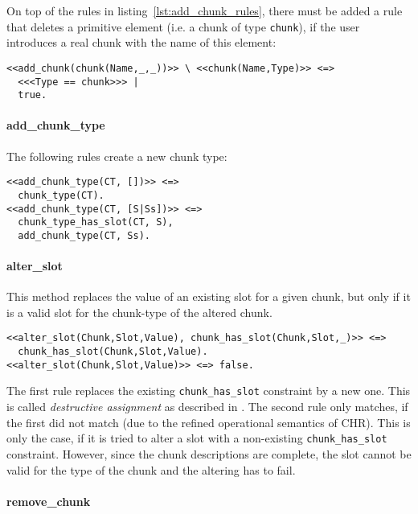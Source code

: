 On top of the rules in listing~\ref{lst:add_chunk_rules}, there must be added a rule that deletes a primitive element (i.e. a chunk of type \lstinline|chunk|), if the user introduces a real chunk with the name of this element:

\begin{lstlisting}[caption={Clean up primitive elements}]  
% delete chunk of Type chunk, if real chunk is added
<<add_chunk(chunk(Name,_,_))>> \ <<chunk(Name,Type)>> <=> 
  <<<Type == chunk>>> |
  true.
\end{lstlisting}


\paragraph{add\_chunk\_type}

The following rules create a new chunk type:

\begin{lstlisting}[caption={rules for \texttt{add\_chunk\_type}}]
<<add_chunk_type(CT, [])>> <=> 
  chunk_type(CT).
<<add_chunk_type(CT, [S|Ss])>> <=> 
  chunk_type_has_slot(CT, S), 
  add_chunk_type(CT, Ss).
\end{lstlisting}

\paragraph{alter\_slot}

This method replaces the value of an existing slot for a given chunk, but only if it is a valid slot for the chunk-type of the altered chunk.

\begin{lstlisting}
<<alter_slot(Chunk,Slot,Value), chunk_has_slot(Chunk,Slot,_)>> <=>
  chunk_has_slot(Chunk,Slot,Value).  
<<alter_slot(Chunk,Slot,Value)>> <=> false.
\end{lstlisting}

The first rule replaces the existing \lstinline|chunk_has_slot| constraint by a new one. This is called \emph{destructive assignment} as described in \cite[32]{fru_chr_book_2009}. The second rule only matches, if the first did not match (due to the refined operational semantics of CHR). This is only the case, if it is tried to alter a slot with a non-existing \lstinline|chunk_has_slot| constraint. However, since the chunk descriptions are complete, the slot cannot be valid for the type of the chunk and the altering has to fail.

\paragraph{remove\_chunk}

